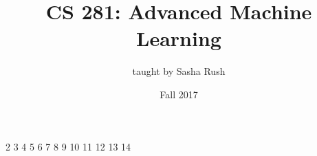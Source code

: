 \documentclass{article}
\begin{document}
\title{CS 281: Advanced Machine Learning}
\date{Fall 2017}
\author{taught by Sasha Rush}
\maketitle

\tableofcontents
\eject

{2}
{3}
{4}
{5}
{6}
{7}
{8}
{9}
{10}
{11}
{12}
{13}
{14}
\end{document}
